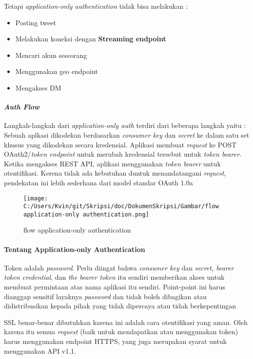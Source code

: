 Tetapi \textit{application-only authentication} tidak bisa melakukan :

\begin{itemize}
	\item Posting tweet
	\item Melakukan koneksi dengan \textbf{Streaming endpoint}
	\item Mencari akun seseorang
	\item Menggunakan geo endpoint
	\item Mengakses DM
\end{itemize}

\paragraph{\textit{Auth Flow}}
Langkah-langkah dari \textit{application-only auth} terdiri dari beberapa langkah yaitu :
Sebuah aplkasi dikodekan berdasarkan \textit{consumer key} dan \textit{secret} ke dalam satu set khusus yang dikodekan secara kredensial.
Aplikasi membuat \textit{request} ke POST OAuth2/\textit{token endpoint} untuk merubah kredensial tersebut untuk \textit{token bearer}.
Ketika mengakses REST API, aplikasi menggunakan \textit{token bearer} untuk otentifikasi.
Kerena tidak ada kebutuhan duntuk menandatangani \textit{request}, pendekatan ini lebih sederhana dari model standar OAuth 1.0a

\begin{figure}
	\centering
		\texttt{[image: C:/Users/Kvin/git/Skripsi/doc/DokumenSkripsi/Gambar/flow application-only authentication.png]}
	\caption{flow application-only authentication}
	\label{fig:flow application-only authentication}
\end{figure}


\paragraph{Tentang Application-only Authentication}
Token adalah \textit{password}. Perlu diingat bahwa \textit{consumer key} dan \textit{secret, bearer token credential}, dan \textit{the bearer token} itu sendiri memberikan akses untuk membuat permintaan atas nama aplikasi itu sendiri. Point-point ini harus dianggap sensitif layaknya \textit{password} dan tidak boleh dibagikan atau didistribusikan kepada pihak yang tidak dipercaya atau tidak berkepentingan

SSL benar-benar dibutuhkan karena ini adalah cara otentifikasi yang aman. Oleh karena itu semua \textit{request} (baik untuk mendapatkan atau menggunakan token) harus menggunakan endpoint HTTPS, yang juga merupakan syarat untuk menggunakan API v1.1.

